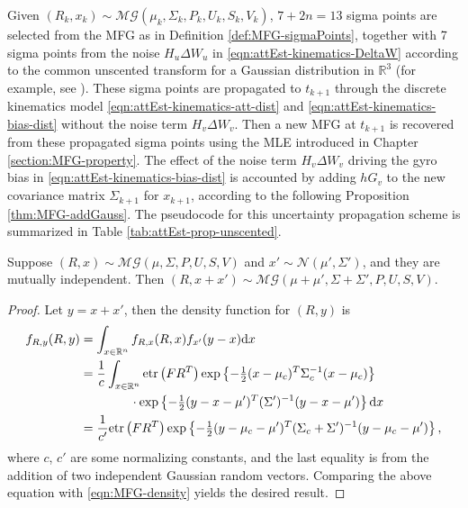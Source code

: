 Given $(R_k,x_k)\sim\mathcal{MG}(\mu_k,\Sigma_k,P_k,U_k,S_k,V_k)$, $7+2n= 13$ sigma points are selected from the MFG as in Definition \ref{def:MFG-sigmaPoints}, together with 7 sigma points from the noise $H_u\Delta W_u$ in \eqref{eqn:attEst-kinematics-DeltaW} according to the common unscented transform for a Gaussian distribution in $\mathbb{R}^3$ (for example, see \cite[Chapter 9]{haug2012bayesian}).
These sigma points are propagated to $t_{k+1}$ through the discrete kinematics model \eqref{eqn:attEst-kinematics-att-dist} and \eqref{eqn:attEst-kinematics-bias-dist} without the noise term $H_v\Delta W_v$.
Then a new MFG at $t_{k+1}$ is recovered from these propagated sigma points using the MLE introduced in Chapter \ref{section:MFG-property}.
The effect of the noise term $H_v\Delta W_v$ driving the gyro bias in \eqref{eqn:attEst-kinematics-bias-dist} is accounted by adding $hG_v$ to the new covariance matrix $\Sigma_{k+1}$ for $x_{k+1}$, according to the following Proposition \ref{thm:MFG-addGauss}.
The pseudocode for this uncertainty propagation scheme is summarized in Table \ref{tab:attEst-prop-unscented}.

\begin{theorem} \label{thm:MFG-addGauss}
	Suppose $(R,x)\sim\mathcal{MG}(\mu,\allowbreak \Sigma,\allowbreak P,\allowbreak U,\allowbreak S,\allowbreak V)$ and $x'\sim\mathcal{N}(\mu',\Sigma')$, and they are mutually independent.
	Then $(R,x+x') \sim \mathcal{MG}(\mu+\mu',\allowbreak \Sigma+\Sigma',\allowbreak P,\allowbreak U,\allowbreak S,\allowbreak V)$.
\end{theorem}
\begin{proof}
	Let $y=x+x'$, then the density function for $(R,y)$ is
	\begin{align*}
		f_{R,y}(R,y) &= \int_{x\in\mathbb{R}^n} f_{R,x}(R,x)f_{x'}(y-x) \mathrm{d} x \\
		&= \frac{1}{c}\int_{x\in\mathbb{R}^n} \mathrm{etr}\left( FR^T \right) \exp\left\{ -\tfrac{1}{2}(x-\mu_c)^T\Sigma_c^{-1}(x-\mu_c) \right\} \\ 
		&\qquad\qquad \cdot \exp\left\{ -\tfrac{1}{2}(y-x-\mu')^T(\Sigma')^{-1}(y-x-\mu') \right\} \mathrm{d} x \\
		&= \frac{1}{c'} \mathrm{etr}\left( FR^T \right) \exp\left\{ -\tfrac{1}{2}(y-\mu_c-\mu')^T (\Sigma_c+\Sigma')^{-1} (y-\mu_c-\mu')  \right\},
	\end{align*}
	where $c$, $c'$ are some normalizing constants, and the last equality is from the addition of two independent Gaussian random vectors.
	Comparing the above equation with \eqref{eqn:MFG-density} yields the desired result.
\end{proof}

